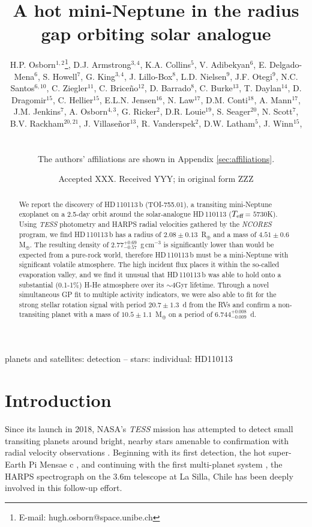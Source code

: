 \documentclass[fleqn,usenatbib]{mnras}
\title[\Tplanet{}]{A hot mini-Neptune in the radius gap orbiting solar analogue \Tstar{}}
\author[H.P. Osborn et al.]{\parbox{\textwidth}{H.P. Osborn$^{1,2}$\thanks{E-mail: hugh.osborn@space.unibe.ch}, 
D.J. Armstrong$^{3,4}$, %
K.A. Collins$^{5}$, %
V. Adibekyan$^{6}$, %
E. Delgado-Mena$^{6}$, %
S. Howell$^{7}$, %
G. King$^{3,4}$, %
J. Lillo-Box$^{8}$, %
L.D. Nielsen$^{9}$, %
J.F. Otegi$^{9}$, %
N.C. Santos$^{6,10}$, %
C. Ziegler$^{11}$, %
C. Brice\~{n}o$^{12}$, %
D. Barrado$^{8}$, %
C. Burke$^{13}$, %
T. Daylan$^{14}$, %
D. Dragomir$^{15}$, %
C. Hellier$^{15}$, %
E.L.N. Jensen$^{16}$, %
N. Law$^{17}$, %
D.M. Conti$^{18}$, %
A. Mann$^{17}$, %
J.M. Jenkins$^{7}$, %
A. Osborn$^{4,3}$, %
G. Ricker$^{2}$, %
D.R. Louie$^{19}$, %
S. Seager$^{20}$, %
N. Scott$^{7}$, %
B.V. Rackham$^{20,21}$, %
J. Villaseñor$^{13}$, %
R. Vanderspek$^{2}$, %
D.W. Latham$^{5}$, %
J. Winn$^{15}$, %
}\\
\parbox{\textwidth}{
The authors' affiliations are shown in Appendix \ref{sec:affiliations}.}
}
\date{Accepted XXX. Received YYY; in original form ZZZ}
\newcommand{\gcm}{g\,cm$^{-3}$}	%
\newcommand{\tess}{{\it TESS}}
\newcommand{\harps}{{HARPS}}
\newcommand{\rearth}{R$_{\oplus}$}
\newcommand{\mearth}{M$_{\oplus}$}
\newcommand{\teff}{$T_{\rm eff}$}
\newcommand{\TPone}{ $ 6.744^{+0.008}_{-0.009} $ }
\newcommand{\TMpzero}{ $ 4.51 \pm 0.6 $ }
\newcommand{\TMpone}{ $ 10.5 \pm 1.1 $ }
\newcommand{\Trpl}{ $ 2.08 \pm 0.13 $ }
\newcommand{\Trhopgcmthree}{ $ 2.77^{+0.69}_{-0.57} $ }
\newcommand{\Tperiod}{ $ 20.7 \pm 1.3 $ }
\newcommand{\TTplanet}{TOI-755.01}
\newcommand{\Tstar}{HD\,110113}
\newcommand{\Tplanet}{HD\,110113\,b}
\begin{document}
\label{firstpage}
\pagerange{\pageref{firstpage}--\pageref{lastpage}}
\maketitle

\begin{abstract}
We report the discovery of \Tplanet{} (\TTplanet{}), a transiting mini-Neptune exoplanet on a 2.5-day orbit around the solar-analogue \Tstar{} (\teff{}= $5730$K).
Using \tess{} photometry and \harps{} radial velocities gathered by the \textit{NCORES} program, we find \Tplanet{} has a radius of \Trpl{}\,\rearth{} and a mass of \TMpzero{}\,\mearth{}.
The resulting density of \Trhopgcmthree{}\,\gcm{} is significantly lower than would be expected from a pure-rock world, therefore \Tplanet{} must be a mini-Neptune with significant volatile atmosphere.
The high incident flux places it within the so-called evaporation valley, and we find it unusual that \Tplanet{} was able to hold onto a substantial (0.1-1\%) H-He atmosphere over its $\sim4$Gyr lifetime.
Through a novel simultaneous GP fit to multiple activity indicators, we were also able to fit for the strong stellar rotation signal with period \Tperiod{}\,d from the RVs and confirm a non-transiting planet with a mass of \TMpone{}\,\mearth{} on a period of \TPone{}\,d.
\end{abstract}

\begin{keywords}
planets and satellites: detection -- stars: individual: HD110113
\end{keywords}



\section{Introduction}
Since its launch in 2018, NASA's \tess{} mission has attempted to detect small transiting planets around bright, nearby stars amenable to confirmation with radial velocity observations \citep{ricker2010transiting}.
Beginning with its first detection, the hot super-Earth Pi Mensae c \citep{huang2018tess}, and continuing with the first multi-planet system \citep[TOI-125][]{quinn2019near,nielsen2020mass}, the \harps{} spectrograph on the 3.6m telescope at La Silla, Chile \citep{2003Msngr.114...20M} has been deeply involved in this follow-up effort.
\end{document}
